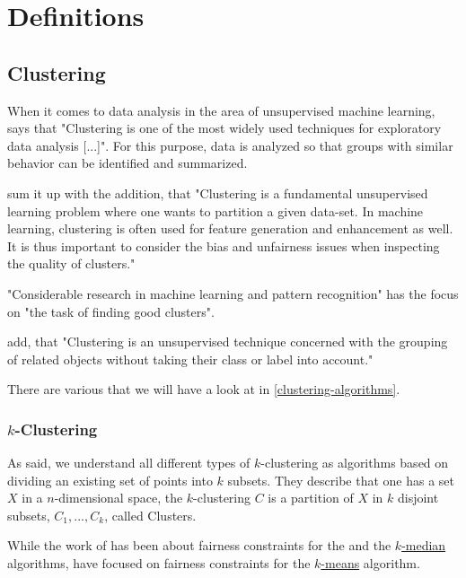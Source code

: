 \section{Definitions}


\subsection{Clustering}

When it comes to data analysis in the area of unsupervised machine learning, \textcite[1]{VonLuxburg2007} says that "Clustering is one of the most widely used techniques for exploratory data analysis [...]". For this purpose, data is analyzed so that groups with similar behavior can be identified and summarized.

\textcite[]{Bera2019} sum it up with the addition, that "Clustering is a fundamental unsupervised learning problem where one wants to partition a given data-set. In machine learning, clustering is often used for feature generation and enhancement as well. It is thus important to consider the bias and unfairness issues when inspecting the quality of clusters." \autocite[1]{Bera2019}

"Considerable research in machine learning and pattern recognition" has the focus on "the task of finding good clusters". \autocite[1]{Ng2001}

\textcite[1]{Nascimento2011} add, that "Clustering is an unsupervised technique concerned with the grouping of related objects without taking their class or label into account."

There are various  that we will have a look at in \autoref{clustering-algorithms}.

\subsubsection{$k$-Clustering}

As  \textcite[]{Chierichetti2018} said, we understand all different types of $k$-clustering as algorithms based on dividing an existing set of points into $k$ subsets. They describe that one has a set $X$ in a $n$-dimensional space, the $k$-clustering $C$ is a partition of $X$ in $k$ disjoint subsets, $C_{1},...,C_{k}$, called Clusters. \autocite[3]{Chierichetti2018}

While the work of \textcite[]{Chierichetti2018} has been about fairness constraints for the  and the \hyperref[k-median]{$k$-median} algorithms, \textcite[]{Schmidt2018} have focused on fairness constraints for the \hyperref[k-means]{$k$-means} algorithm.

